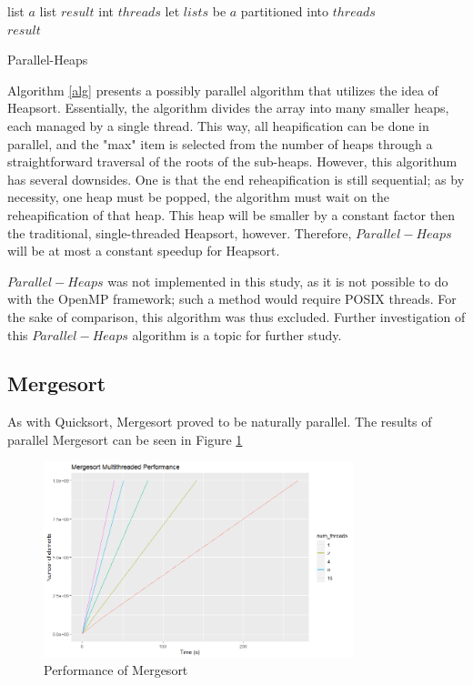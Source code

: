 \documentclass[conference]{IEEEtran}
\begin{document}
    \begin{algorithm}
        \SetAlgoLined
        list $a$\;
        list $result$\;
        int $threads$\;
        let $lists$ be $a$ partitioned into $threads$\\
        \Return $result$
        \caption{Parallel-Heaps}
        \label{alg}
    \end{algorithm}
    Algorithm \ref{alg} presents a possibly parallel algorithm that utilizes the idea of Heapsort. 
    Essentially, the algorithm divides the array into many smaller heaps, each managed by a single thread. 
    This way, all heapification can be done in parallel, and the "max" item is selected from the number of heaps through a straightforward traversal of the roots of the sub-heaps. 
    However, this algorithum has several downsides. 
    One is that the end reheapification is still sequential; as by necessity, one heap must be popped, the algorithm must wait on the reheapification of that heap. 
    This heap will be smaller by a constant factor then the traditional, single-threaded Heapsort, however. 
    Therefore, $Parallel-Heaps$ will be at most a constant speedup for Heapsort.
    
    $Parallel-Heaps$ was not implemented in this study, as it is not possible to do with the OpenMP framework; such a method would require POSIX threads. 
    For the sake of comparison, this algorithm was thus excluded. 
    Further investigation of this $Parallel-Heaps$ algorithm is a topic for further study.  
    \subsection{Mergesort}
    As with Quicksort, Mergesort proved to be naturally parallel. 
    The results of parallel Mergesort can be seen in Figure \ref{ms_per}
    \begin{figure}[h]
        \includegraphics[width=9cm]{ms_per.png} 
        \caption{Performance of Mergesort}
        \label{ms_per}
    \end{figure}
    
\end{document}
